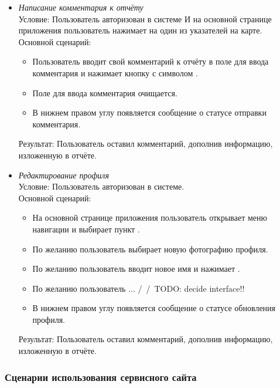 \begin{itemize}[topsep=0pt, parsep=0pt, itemsep=0pt, leftmargin=*, labelindent=0.5cm]
	\item \textit{Написание комментария к отчёту} \\
	Условие: Пользователь авторизован в системе И на основной странице приложения пользователь нажимает на один из указателей на карте. \\
	Основной сценарий:
	\begin{itemize}[topsep=0pt, parsep=0pt, itemsep=0pt, leftmargin=*, labelindent=0.5cm]
		\item Пользователь вводит свой комментарий к отчёту в поле для ввода комментария и нажимает кнопку с символом \textquote{>}.
		\item Поле для ввода комментария очищается.
		\item В нижнем правом углу появляется сообщение о статусе отправки комментария.
	\end{itemize}
	Результат: Пользователь оставил комментарий, дополнив информацию, изложенную в отчёте.
	
	\item \textit{Редактирование профиля} \\
	Условие: Пользователь авторизован в системе. \\
	Основной сценарий:
	\begin{itemize}[topsep=0pt, parsep=0pt, itemsep=0pt, leftmargin=*, labelindent=0.5cm]
		\item На основной странице приложения пользователь открывает меню навигации и выбирает пункт .
		\item По желанию пользователь выбирает новую фотографию профиля.
		\item По желанию пользователь вводит новое имя и нажимает .
		\item По желанию пользователь ...
		/\ /\ TODO: decide interface!!
		\item В нижнем правом углу появляется сообщение о статусе обновления профиля.
	\end{itemize}
	Результат: Пользователь оставил комментарий, дополнив информацию, изложенную в отчёте.
\end{itemize}

\subsubsection{Сценарии использования сервисного сайта}

